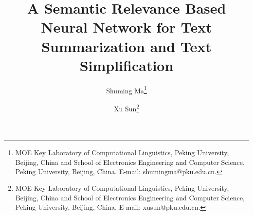 \documentclass{clv3}
\begin{document}
\begin{CJK*}{UTF8}{gbsn}

\title{A Semantic Relevance Based Neural Network for Text Summarization and Text  Simplification}

\author{Shuming Ma\thanks{MOE Key Laboratory of Computational Linguistics, Peking University, Beijing, China and School of Electronics Engineering and Computer Science, Peking University, Beijing, China. E-mail: shumingma@pku.edu.cn.}}

\author{Xu Sun\thanks{MOE Key Laboratory of Computational Linguistics, Peking University, Beijing, China and School of Electronics Engineering and Computer Science, Peking University, Beijing, China. E-mail: xusun@pku.edu.cn.}}






\end{CJK*}
\end{document}
